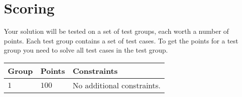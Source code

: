\section*{Scoring}
Your solution will be tested on a set of test groups, each worth a number of points. Each test group contains
a set of test cases. To get the points for a test group you need to solve all test cases in the test group.

\noindent
\begin{tabular}{| l | l | p{12cm} |}
  \hline
  \textbf{Group} & \textbf{Points} & \textbf{Constraints} \\ \hline
  $1$    & $100$       & No additional constraints. \\ \hline
\end{tabular}
